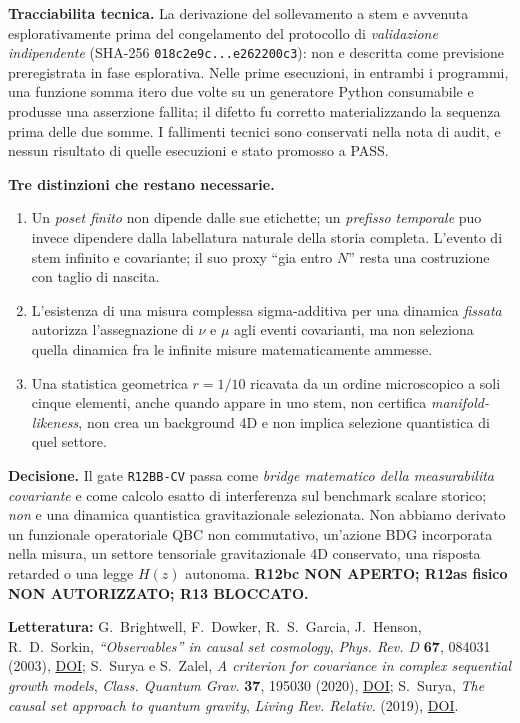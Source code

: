 \documentclass[11pt,a4paper]{article}
\begin{document}
\textbf{Tracciabilita tecnica.} La derivazione del sollevamento a stem e avvenuta esplorativamente prima del congelamento del protocollo di \emph{validazione indipendente} (SHA-256 \texttt{018c2e9c...e262200c3}): non e descritta come previsione preregistrata in fase esplorativa. Nelle prime esecuzioni, in entrambi i programmi, una funzione somma itero due volte su un generatore Python consumabile e produsse una asserzione fallita; il difetto fu corretto materializzando la sequenza prima delle due somme. I fallimenti tecnici sono conservati nella nota di audit, e nessun risultato di quelle esecuzioni e stato promosso a PASS.

\textbf{Tre distinzioni che restano necessarie.}
\begin{enumerate}
 \item Un \emph{poset finito} non dipende dalle sue etichette; un \emph{prefisso temporale} puo invece dipendere dalla labellatura naturale della storia completa. L'evento di stem infinito e covariante; il suo proxy ``gia entro $N$'' resta una costruzione con taglio di nascita.
 \item L'esistenza di una misura complessa sigma-additiva per una dinamica \emph{fissata} autorizza l'assegnazione di $\nu$ e $\mu$ agli eventi covarianti, ma non seleziona quella dinamica fra le infinite misure matematicamente ammesse.
 \item Una statistica geometrica $r=1/10$ ricavata da un ordine microscopico a soli cinque elementi, anche quando appare in uno stem, non certifica \emph{manifold-likeness}, non crea un background 4D e non implica selezione quantistica di quel settore.
\end{enumerate}
\textbf{Decisione.} Il gate \texttt{R12BB-CV} passa come \emph{bridge matematico della measurabilita covariante} e come calcolo esatto di interferenza sul benchmark scalare storico; \emph{non} e una dinamica quantistica gravitazionale selezionata. Non abbiamo derivato un funzionale operatoriale QBC non commutativo, un'azione BDG incorporata nella misura, un settore tensoriale gravitazionale 4D conservato, una risposta retarded o una legge $H(z)$ autonoma. \textbf{R12bc NON APERTO; R12as fisico NON AUTORIZZATO; R13 BLOCCATO.}

\textbf{Letteratura:} G.~Brightwell, F.~Dowker, R.~S.~Garcia, J.~Henson, R.~D.~Sorkin, \emph{``Observables'' in causal set cosmology}, \emph{Phys. Rev. D} \textbf{67}, 084031 (2003), \href{https://doi.org/10.1103/PhysRevD.67.084031}{DOI}; S.~Surya e S.~Zalel, \emph{A criterion for covariance in complex sequential growth models}, \emph{Class. Quantum Grav.} \textbf{37}, 195030 (2020), \href{https://doi.org/10.1088/1361-6382/ab987f}{DOI}; S.~Surya, \emph{The causal set approach to quantum gravity}, \emph{Living Rev. Relativ.} (2019), \href{https://doi.org/10.1007/s41114-019-0023-1}{DOI}.
\end{document}
